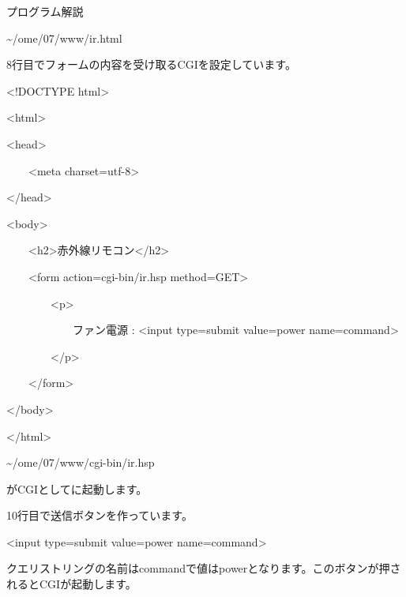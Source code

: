 \documentclass[a4paper,12pt,dvipdfmx]{jarticle}
\begin{document}
\bigskip

\clearpage
プログラム解説

\~{}/ome/07/www/ir.html

8行目でフォームの内容を受け取るCGIを設定しています。

\centering
\begin{boxedminipage}{0.95\textwidth}
{\textless}!DOCTYPE html{\textgreater}

{\textless}html{\textgreater}

{\textless}head{\textgreater}

\ \ \ \ {\textless}meta charset={\textquotedbl}utf-8{\textquotedbl}{\textgreater}

{\textless}/head{\textgreater}

{\textless}body{\textgreater}

\ \ \ \ {\textless}h2{\textgreater}赤外線リモコン{\textless}/h2{\textgreater}

\ \ \ \ {\textless}form action={\textquotedbl}cgi-bin/ir.hsp{\textquotedbl}
method={\textquotedbl}GET{\textquotedbl}{\textgreater}

\ \ \ \ \ \ \ \ {\textless}p{\textgreater}

\ \ \ \ \ \ \ \ \ \ \ \ ファン電源 : {\textless}input type={\textquotedbl}submit{\textquotedbl}
value={\textquotedbl}power{\textquotedbl} name={\textquotedbl}command{\textquotedbl}{\textgreater}

\ \ \ \ \ \ \ \ {\textless}/p{\textgreater}

\ \ \ \ {\textless}/form{\textgreater}

{\textless}/body{\textgreater}

{\textless}/html{\textgreater}
\end{boxedminipage}
\flushleft
\~{}/ome/07/www/cgi-bin/ir.hsp

がCGIとしてに起動します。

10行目で送信ボタンを作っています。

{\textless}input type={\textquotedbl}submit{\textquotedbl} value={\textquotedbl}power{\textquotedbl}
name={\textquotedbl}command{\textquotedbl}{\textgreater}

クエリストリングの名前はcommandで値はpowerとなります。このボタンが押されるとCGIが起動します。


\bigskip


\bigskip

\bigskip
\end{document}
